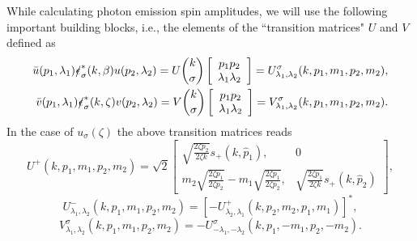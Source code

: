 While calculating photon emission spin amplitudes, we will use the following important building blocks, i.e., the elements of the ``transition matrices" $U$ and $V$ defined as 
\begin{eqnarray}
\bar{u}(p_1,\lambda_1)\slashed\epsilon^\ast_\sigma(k,\beta)u(p_2,\lambda_2)=U\binom{k}{\sigma}\left[\begin{array}{c}
p_1p_2\\\lambda_1\lambda_2
\end{array}\right]=U^\sigma_{\lambda_1,\lambda_2}(k,p_1,m_1,p_2,m_2),\nonumber\\
\bar{v}(p_1,\lambda_1)\slashed\epsilon^\ast_\sigma(k,\zeta)v(p_2,\lambda_2)=V\binom{k}{\sigma}\left[\begin{array}{c}
p_1p_2\\\lambda_1\lambda_2
\end{array}\right]=V^\sigma_{\lambda_1,\lambda_2}(k,p_1,m_1,p_2,m_2).\nonumber\\
\end{eqnarray}
In the case of $u_\sigma(\zeta)$ the above transition matrices reads
\begin{equation}
U^+(k,p_1,m_1,p_2,m_2)=\sqrt{2}\left[\begin{array}{cc}
\sqrt{\frac{2\zeta p_2}{2\zeta k}}s_+(k,\hat{p}_1),&0\\
m_2\sqrt{\frac{2\zeta p_1}{2\zeta p_2}}-m_1\sqrt{\frac{2\zeta p_1}{2\zeta p_2}},&\sqrt{\frac{2\zeta p_1}{2\zeta k}}s_+(k,\hat{p}_2)
\end{array}\right],
\end{equation}
\begin{equation}
U^-_{\lambda_1,\lambda_2}(k,p_1,m_1,p_2,m_2)=[-U^+_{\lambda_2,\lambda_1}(k,p_2,m_2,p_1,m_1)]^\ast,
\end{equation}
\begin{equation}
V^\sigma_{\lambda_1,\lambda_2}(k,p_1,m_1,p_2,m_2)=-U^\sigma_{-\lambda_1,-\lambda_2}(k,p_1,-m_1,p_2,-m_2).
\end{equation}

